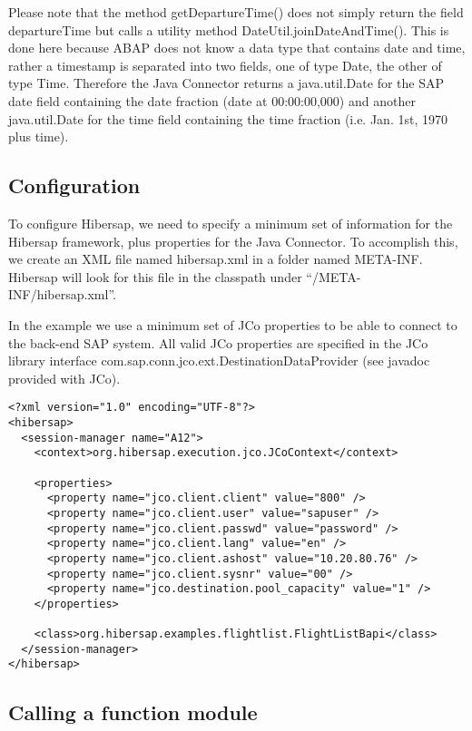 Please note that the method getDepartureTime() does not simply return the field departureTime
but calls a utility method DateUtil.joinDateAndTime(). This is done here because ABAP does not know a
data type that contains date and time, rather a timestamp is separated into two fields, one
of type Date, the other of type Time. Therefore the Java Connector returns a java.util.Date for the SAP
date field containing the date fraction (date at 00:00:00,000) and another java.util.Date for the time
field containing the time fraction (i.e. Jan. 1st, 1970 plus time).


\subsection{Configuration}

To configure Hibersap, we need to specify a minimum set of information for the Hibersap framework,
plus properties for the Java Connector. To accomplish this, we create an XML file named hibersap.xml in a folder
named META-INF. Hibersap will look for this file in the classpath under ``/META-INF/hibersap.xml''.

In the example we use a minimum set of JCo properties to be able to connect to the back-end SAP system.
All valid JCo properties are specified in the JCo library interface com.sap.conn.jco.ext.\-DestinationDataProvider (see
javadoc provided with JCo).

\begin{Verbatim}[frame=single,label=hibersap.xml]
<?xml version="1.0" encoding="UTF-8"?>
<hibersap>
  <session-manager name="A12">
    <context>org.hibersap.execution.jco.JCoContext</context>

    <properties>
      <property name="jco.client.client" value="800" />
      <property name="jco.client.user" value="sapuser" />
      <property name="jco.client.passwd" value="password" />
      <property name="jco.client.lang" value="en" />
      <property name="jco.client.ashost" value="10.20.80.76" />
      <property name="jco.client.sysnr" value="00" />
      <property name="jco.destination.pool_capacity" value="1" />
    </properties>

    <class>org.hibersap.examples.flightlist.FlightListBapi</class>
  </session-manager>
</hibersap>
\end{Verbatim}


\subsection{Calling a function module}

